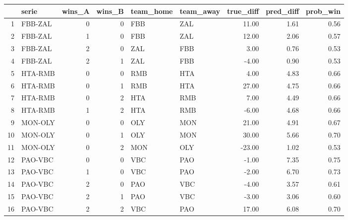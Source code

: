 \begin{table}[ht]
\centering
\begin{tabular}{rlrrllrrr}
  \hline
 & serie & wins\_A & wins\_B & team\_home & team\_away & true\_diff & pred\_diff & prob\_win \\ 
  \hline
1 & FBB-ZAL &   0 &   0 & FBB & ZAL & 11.00 & 1.61 & 0.56 \\ 
  2 & FBB-ZAL &   1 &   0 & FBB & ZAL & 12.00 & 2.06 & 0.57 \\ 
  3 & FBB-ZAL &   2 &   0 & ZAL & FBB & 3.00 & 0.76 & 0.53 \\ 
  4 & FBB-ZAL &   2 &   1 & ZAL & FBB & -4.00 & 0.90 & 0.53 \\ 
  5 & HTA-RMB &   0 &   0 & RMB & HTA & 4.00 & 4.83 & 0.66 \\ 
  6 & HTA-RMB &   0 &   1 & RMB & HTA & 27.00 & 4.75 & 0.66 \\ 
  7 & HTA-RMB &   0 &   2 & HTA & RMB & 7.00 & 4.49 & 0.66 \\ 
  8 & HTA-RMB &   1 &   2 & HTA & RMB & -6.00 & 4.68 & 0.66 \\ 
  9 & MON-OLY &   0 &   0 & OLY & MON & 21.00 & 4.91 & 0.67 \\ 
  10 & MON-OLY &   0 &   1 & OLY & MON & 30.00 & 5.66 & 0.70 \\ 
  11 & MON-OLY &   0 &   2 & MON & OLY & -23.00 & 1.02 & 0.53 \\ 
  12 & PAO-VBC &   0 &   0 & VBC & PAO & -1.00 & 7.35 & 0.75 \\ 
  13 & PAO-VBC &   1 &   0 & VBC & PAO & -2.00 & 6.70 & 0.73 \\ 
  14 & PAO-VBC &   2 &   0 & PAO & VBC & -4.00 & 3.57 & 0.61 \\ 
  15 & PAO-VBC &   2 &   1 & PAO & VBC & -3.00 & 3.06 & 0.60 \\ 
  16 & PAO-VBC &   2 &   2 & VBC & PAO & 17.00 & 6.08 & 0.70 \\ 
   \hline
\end{tabular}
\end{table}
